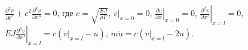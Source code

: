 $\frac{\partial ^2v}{\partial t^2} +
c^2 \frac{\partial ^4v}{\partial x^4} = 0$,
где $c = \sqrt{\frac{EJ}{\rho F}}$, $\left. v \right|_{x=0} = 0$,
$\left.\frac{\partial v}{\partial x}\right| _{x=0} = 0$,
$\left.\frac{\partial ^2v}{\partial x^2}\right| _{x = l} = 0$,
$\left.EJ\frac{\partial ^3v}{\partial x^3}\right| _{x = l} =
c(\left.v \right| _{x = l} - u)$,
$m\ddot{u} = c(\left.v\right| _{x=l} - 2u)$.
